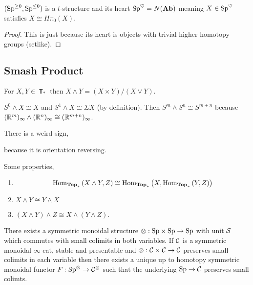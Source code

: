 \documentclass[12pt]{article}
\begin{document}
\newcommand{\heart}{\heartsuit}
\newcommand{\EE}{\mathbb{E}}

\begin{prop}
$(\Sp^{\ge 0}, \Sp^{\le 0})$ is a $t$-structure and its heart $\Sp^{\heart} = N(\Ab)$ meaning $X \in \Sp^{\heart}$ satisfies $X \cong H \pi_0(X)$.
\end{prop}

\begin{proof}
This is just because its heart is objects with trivial higher homotopy groups (setlike). 
\end{proof}

\subsection{Smash Product}

For $X, Y \in \Top_*$ then $X \wedge Y = (X \times Y) / (X \vee Y)$.

\begin{example}
$S^0 \wedge X \cong X$ and $S^1 \wedge X \cong \Sigma X$ (by definition). Then $S^m \wedge S^n \cong S^{m+n}$ because $(\RR^m)_{\infty} \wedge (\RR^n)_{\infty} \cong (\RR^{m+n})_{\infty}$.
\end{example}

\begin{example}
There is a weird sign,
\begin{center}
\end{center}
because it is orientation reversing. 
\end{example}

\begin{prop}
Some properties,
\begin{enumerate}
\item \[ \Hom{\Top_*}{X \wedge Y}{Z} \cong \Hom{\Top_*}{X}{\Hom{\Top_*}{Y}{Z}} \]

\item $X \wedge Y \cong Y \wedge X$

\item $(X \wedge Y) \wedge Z \cong X \wedge (Y \wedge Z)$. 
\end{enumerate}
\end{prop}


\begin{theorem}[HA, 4.8.2.19]
There exists a symmetric monoidal structure $\ot : \Sp \times \Sp \to \Sp$ with unit $\S$ which commutes with small colimits in both variables. If $\C$ is a symmetric monoidal $\infty$-cat, stable and presentable and $\ot : \C \times \C \to \C$ preserves small colimits in each variable then there exists a unique up to homotopy symmetric monoidal functor $F : \Sp^\ot \to \C^\ot$ such that the underlying $\Sp \to \C$ preserves small colimts. 
\end{theorem}
\end{document}
